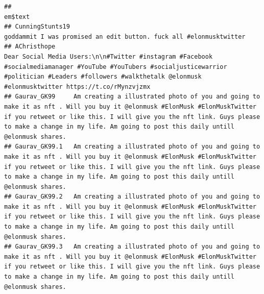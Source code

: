 \documentclass[
]{article}
\newenvironment{Shaded}{\begin{snugshade}}{\end{snugshade}}
\newcommand{\FunctionTok}[1]{\textcolor[rgb]{0.00,0.00,0.00}{#1}}
\newcommand{\NormalTok}[1]{#1}
\newcommand{\OtherTok}[1]{\textcolor[rgb]{0.56,0.35,0.01}{#1}}
\newcommand{\SpecialCharTok}[1]{\textcolor[rgb]{0.00,0.00,0.00}{#1}}
\begin{document}
\begin{Shaded}
\end{Shaded}

\begin{verbatim}
##                                                                                                                                                                                                                                                                                            em$text
## CunningStunts19                                                                                                                                                                                                                 goddammit I was promised an edit button. fuck all #elonmusktwitter
## AChristhope                                                                Dear Social Media Users:\n\n#Twitter #instagram #Facebook #socialmediamanager #YouTube #YouTubers #socialjusticewarrior #politician #Leaders #followers #walkthetalk @elonmusk #elonmusktwitter https://t.co/rMynzvjzmx
## Gaurav_GK99     Am creating a illustrated photo of you and going to make it as nft . Will you buy it @elonmusk #ElonMusk #ElonMuskTwitter if you retweet or like this. I will give you the nft link. Guys please to make a change in my life. Am going to post this daily untill @elonmusk shares.
## Gaurav_GK99.1   Am creating a illustrated photo of you and going to make it as nft . Will you buy it @elonmusk #ElonMusk #ElonMuskTwitter if you retweet or like this. I will give you the nft link. Guys please to make a change in my life. Am going to post this daily untill @elonmusk shares.
## Gaurav_GK99.2   Am creating a illustrated photo of you and going to make it as nft . Will you buy it @elonmusk #ElonMusk #ElonMuskTwitter if you retweet or like this. I will give you the nft link. Guys please to make a change in my life. Am going to post this daily untill @elonmusk shares.
## Gaurav_GK99.3   Am creating a illustrated photo of you and going to make it as nft . Will you buy it @elonmusk #ElonMusk #ElonMuskTwitter if you retweet or like this. I will give you the nft link. Guys please to make a change in my life. Am going to post this daily untill @elonmusk shares.
\end{verbatim}
\end{document}

